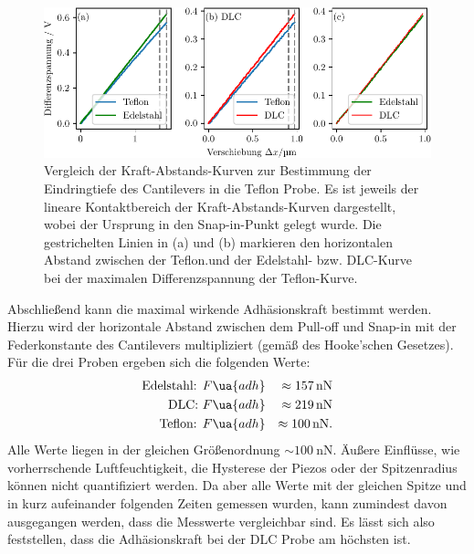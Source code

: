\begin{figure}
  \centering
  \includegraphics[scale = 1]{../analysis/data/force_distance/eindringtiefe.pdf}
  \caption{Vergleich der Kraft-Abstands-Kurven zur Bestimmung der Eindringtiefe des Cantilevers in die Teflon Probe.
  Es ist jeweils der lineare Kontaktbereich der Kraft-Abstands-Kurven dargestellt, wobei der Ursprung in den Snap-in-Punkt
  gelegt wurde. Die gestrichelten Linien in (a) und (b) markieren den horizontalen Abstand zwischen der Teflon.und der Edelstahl- bzw. DLC-Kurve
  bei der maximalen Differenzspannung der Teflon-Kurve.}
  \label{fig: depth}
\end{figure}

Abschließend kann die maximal wirkende Adhäsionskraft bestimmt werden. Hierzu wird der horizontale
Abstand zwischen dem Pull-off und Snap-in mit der Federkonstante des Cantilevers multipliziert (gemäß des Hooke'schen Gesetzes).
Für die drei Proben ergeben sich die folgenden Werte:
\begin{align}
  \begin{aligned}
    \text{Edelstahl: } & F\ua{adh} &\approx \SI{157}{\nano\newton}\\
    \text{DLC: } & F\ua{adh}       &\approx \SI{219}{\nano\newton}\\
    \text{Teflon: } & F\ua{adh}    &\approx \SI{100}{\nano\newton}.
  \end{aligned}
\end{align}
Alle Werte liegen in der gleichen Größenordnung $\sim \SI{100}{\nano\newton}$. Äußere Einflüsse, wie vorherrschende Luftfeuchtigkeit,
die Hysterese der Piezos oder der Spitzenradius können nicht quantifiziert werden. Da aber alle Werte mit der gleichen Spitze und in kurz aufeinander
folgenden Zeiten gemessen wurden, kann zumindest davon ausgegangen werden, dass die Messwerte vergleichbar sind. Es lässt sich also feststellen, dass die
Adhäsionskraft bei der DLC Probe am höchsten ist.
\FloatBarrier
